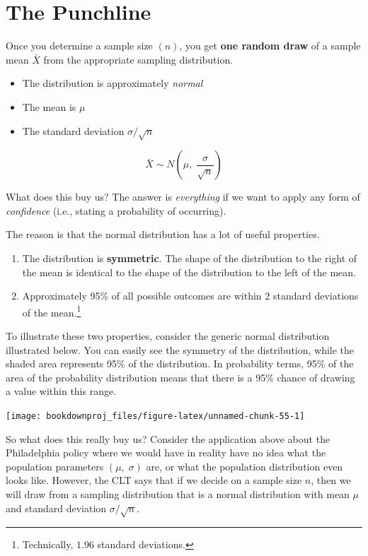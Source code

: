 \documentclass[
]{book}
\begin{document}
\hypertarget{the-punchline-1}{%
\section{The Punchline}\label{the-punchline-1}}

Once you determine a sample size \((n)\), you get \textbf{one random draw} of a sample mean \(\bar{X}\) from the appropriate sampling distribution.

\begin{itemize}
\item
  The distribution is approximately \emph{normal}
\item
  The mean is \(\mu\)
\item
  The standard deviation \(\sigma/\sqrt{n}\)
\end{itemize}

\[\bar{X} \sim N \left( \mu, \; \frac{\sigma}{\sqrt{n}} \right)\]

What does this buy us? The answer is \emph{everything} if we want to apply any form of \emph{confidence} (i.e., stating a probability of occurring).

The reason is that the normal distribution has a lot of useful properties.

\begin{enumerate}
\def\labelenumi{\arabic{enumi}.}
\item
  The distribution is \textbf{symmetric}. The shape of the distribution to the right of the mean is identical to the shape of the distribution to the left of the mean.
\item
  Approximately 95\% of all possible outcomes are within 2 standard deviations of the mean.\footnote{Technically, \(1.96\) standard deviations.}
\end{enumerate}

To illustrate these two properties, consider the generic normal distribution illustrated below. You can easily see the symmetry of the distribution, while the shaded area represents 95\% of the distribution. In probability terms, 95\% of the area of the probability distribution means that there is a 95\% chance of drawing a value within this range.

\begin{center}\texttt{[image: bookdownproj\_files/figure-latex/unnamed-chunk-55-1]} \end{center}

So what does this really buy us? Consider the application above about the Philadelphia policy where we would have in reality have no idea what the population parameters \((\mu,\;\sigma)\) are, or what the population distribution even looks like. However, the CLT says that if we decide on a sample size \(n\), then we will draw from a sampling distribution that is a normal distribution with mean \(\mu\) and standard deviation \(\sigma / \sqrt{n}\).
\end{document}
